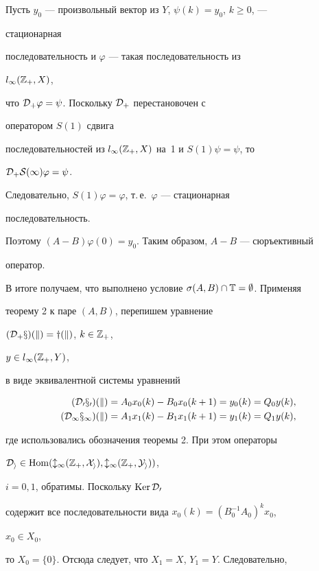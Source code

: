 \begin{pf}
 


Пусть $y_0$ --- произвольный вектор из $Y$, $\psi(k)=y_0$, $k\ge0$, --- 


стационарная 


последовательность и $\varphi$ --- такая последовательность из 


$l_\infty(\Bbb Z_+,X)$, 


что $\cal D_+\varphi=\psi$. Поскольку $\cal D_+$ перестановочен с 


оператором $S(1)$ сдвига 


последовательностей из $l_\infty(\Bbb Z_+,X)$ на~1 и $S(1)\psi=\psi$, то 


$\cal D_+S(1)\varphi=\psi$. 


Следовательно, $S(1)\varphi=\varphi$, т.\,е.\ $\varphi$ --- стационарная 


последовательность. 


Поэтому $(A-B)\varphi(0)=y_0$. Таким образом, $A-B$ --- сюръективный 


оператор. 


 


В итоге получаем, что выполнено условие $\sigma(A,B)\cap\Bbb 


T=\emptyset$. Применяя 


теорему 2 к паре $(A,B)$, перепишем уравнение


$(\cal D_+x)(k)=y(k)$, $k\in\Bbb Z_+$, 


$y\in l_\infty(\Bbb Z_+,Y)$, 


в виде эквивалентной системы уравнений 


\begin{align*} 


(\cal D_0x_0)(k)&=A_0x_0(k)-B_0x_0(k+1)=y_0(k)=Q_0y(k),\\ 


(\cal D_1x_1)(k)&=A_1x_1(k)-B_1x_1(k+1)=y_1(k)=Q_1y(k), 


\end{align*} 


где использовались обозначения теоремы 2. При этом операторы 


$\cal D_i\in\operatorname{Hom}(l_\infty(\Bbb Z_+,X_i),l_\infty(\Bbb Z_+,Y_i))$, 


$i=0,1$, обратимы. Поскольку $\operatorname{Ker}\cal D_0$ 


содержит все последовательности вида $x_0(k)=(B^{-1}_0A_0)^k x_0$, 


$x_0\in X_0$, 


то $X_0=\{0\}$. Отсюда следует, что $X_1=X$, $Y_1=Y$. Следовательно, 



\end{pf}

